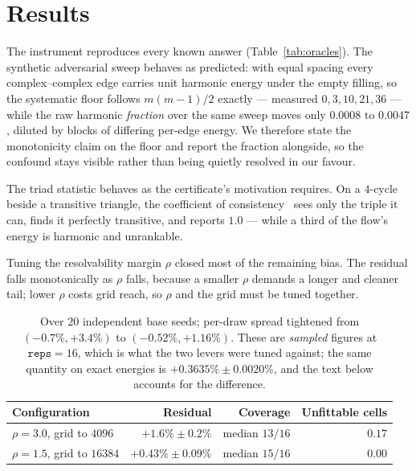 \documentclass[11pt,a4paper]{article}
\begin{document}
\section{Results}\label{sec:results}

The instrument reproduces every known answer (Table~\ref{tab:oracles}). The synthetic adversarial
sweep behaves as predicted: with equal spacing every complex--complex edge
carries unit harmonic energy under the empty filling, so the systematic floor
follows $m(m-1)/2$ exactly --- measured $0, 3, 10, 21, 36$ --- while the raw
harmonic \emph{fraction} over the same sweep moves only $0.0008$ to $0.0047$,
diluted by blocks of differing per-edge energy. We therefore state the
monotonicity claim on the floor and report the fraction alongside, so the
confound stays visible rather than being quietly resolved in our favour.

The triad statistic behaves as the certificate's motivation requires. On a
$4$-cycle beside a transitive triangle, the coefficient of
consistency~\cite{kendall1940} sees only the triple it can, finds it perfectly
transitive, and reports $1.0$ --- while a third of the flow's energy is harmonic
and unrankable.

Tuning the resolvability margin $\rho$ closed most of the remaining bias. The
residual falls monotonically as $\rho$ falls, because a smaller $\rho$ demands a
longer and cleaner tail; lower $\rho$ costs grid reach, so $\rho$ and the grid
must be tuned together.

\begin{table}[h]
\centering
\small
\begin{tabular}{@{}lrrr@{}}
\toprule
\textbf{Configuration} & \textbf{Residual} & \textbf{Coverage} & \textbf{Unfittable cells} \\
\midrule
$\rho = 3.0$, grid to $4096$   & $+1.6\% \pm 0.2\%$   & median $13/16$ & $0.17$ \\
$\rho = 1.5$, grid to $16384$  & $+0.43\% \pm 0.09\%$ & median $15/16$ & $0.00$ \\
\bottomrule
\end{tabular}
\caption{Over $20$ independent base seeds; per-draw spread tightened from
$(-0.7\%, +3.4\%)$ to $(-0.52\%, +1.16\%)$. These are \emph{sampled} figures at
$\texttt{reps}=16$, which is what the two levers were tuned against; the same
quantity on exact energies is $+0.3635\% \pm 0.0020\%$, and the text below
accounts for the difference.\label{tab:rho}}
\end{table}
\end{document}
